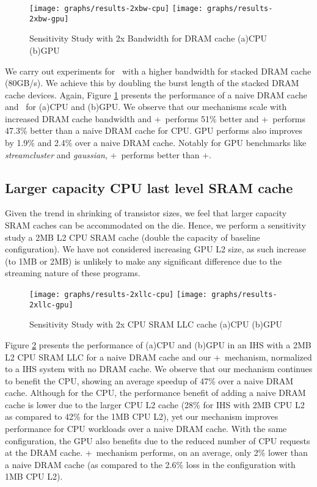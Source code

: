 \begin{figure}[!htb]
	\centering
	\texttt{[image: graphs/results-2xbw-cpu]}
	\texttt{[image: graphs/results-2xbw-gpu]}
	\caption{Sensitivity Study with 2x Bandwidth for DRAM cache (a)CPU (b)GPU}
	\label{results-ddr3-2133}
\end{figure}

We carry out experiments for \cachename\ with a higher bandwidth for stacked DRAM cache (80GB/s). We achieve this by doubling the burst length of the stacked DRAM cache devices. Again, Figure \ref{results-ddr3-2133}  presents the performance of a naive DRAM cache and \cachename\ for (a)CPU and (b)GPU. We observe that our mechanisms scale with increased DRAM cache bandwidth and \bypassname+\prioname\ performs 51\% better and \chaining+\prioname\ performs 47.3\% better than a naive DRAM cache for CPU. GPU performs also improves by 1.9\% and 2.4\% over a naive DRAM cache. Notably for GPU benchmarks like \textit{streamcluster} and \textit{gaussian}, \chaining+\prioname\ performs better than \bypassname+\prioname.

\subsection{Larger capacity CPU last level SRAM cache}
Given the trend in shrinking of transistor sizes, we feel that larger capacity SRAM caches can be accommodated on the die. Hence, we perform a sensitivity study a 2MB L2 CPU SRAM cache (double the capacity of baseline configuration). We have not considered increasing GPU L2 size, as such increase (to 1MB or 2MB) is unlikely to make any significant difference due to the streaming nature of these programs.

\begin{figure}[!htb]
	\centering
	\texttt{[image: graphs/results-2xllc-cpu]}
	\texttt{[image: graphs/results-2xllc-gpu]}
	\caption{Sensitivity Study with 2x CPU SRAM LLC cache (a)CPU (b)GPU}
	\label{results-2mb-llc}
\end{figure}

\par Figure \ref{results-2mb-llc} presents the performance of (a)CPU and (b)GPU in an IHS with a 2MB L2 CPU SRAM LLC for a naive DRAM cache and our \bypassname+\prioname\ mechanism, normalized to a IHS system with no DRAM cache. We observe that our mechanism continues to benefit the CPU, showing an average speedup of 47\% over a naive DRAM cache. Although for the CPU, the performance benefit of adding a naive DRAM cache is lower due to the larger CPU L2 cache (28\% for IHS with 2MB CPU L2 as compared to 42\% for the 1MB CPU L2), yet our mechanism improves performance for CPU workloads over a naive DRAM cache. With the same configuration, the GPU also benefits due to the reduced number of CPU requests at the DRAM cache. \bypassname+\prioname\ mechanism performs, on an average, only 2\% lower than a naive DRAM cache (as compared to the 2.6\% loss in the configuration with 1MB CPU L2).

